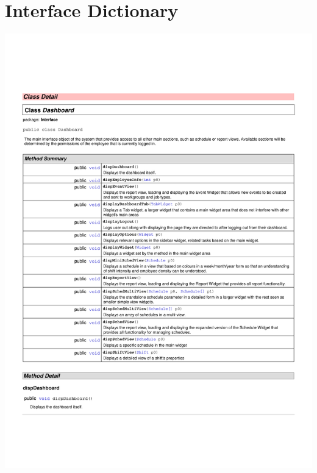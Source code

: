 \documentclass[letterpaper,12pt]{report}
\begin{document}
\section{Interface Dictionary}
\includegraphics[scale=0.9,trim=10mm 30mm 25mm 35mm]{externals/InterfaceDataDictionary1.pdf}
\newpage
\end{document}
